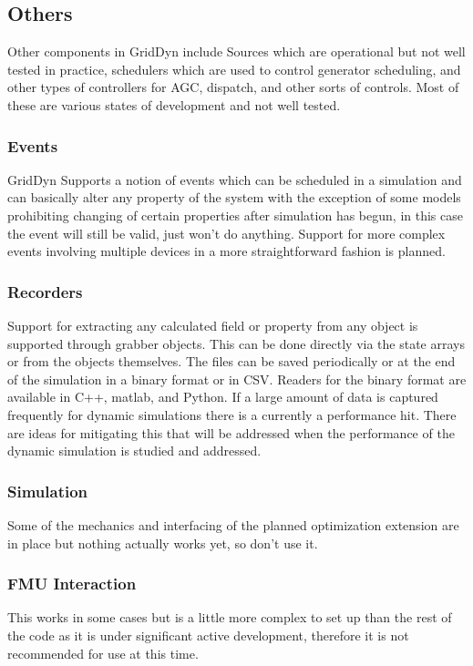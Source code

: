 \documentclass[12pt]{article} %
\begin{document}
\subsection{Others}
Other components in GridDyn include Sources which are operational but not well tested in practice,  schedulers which are used to control generator scheduling, and other types of controllers for AGC,  dispatch, and other sorts of controls.  Most of these are various states of development and not well tested.

\subsubsection{Events}
GridDyn Supports a notion of events which can be scheduled in a simulation and can basically alter any property of the system with the exception of some models prohibiting changing of certain properties after simulation has begun, in this case the event will still be valid, just won't do anything.  Support for more complex events involving multiple devices in a more straightforward fashion is planned.

\subsubsection{Recorders}
Support for extracting any calculated field or property from any object is supported through grabber objects.  This can be done directly via the state arrays or from the objects themselves.  The files can be saved periodically or at the end of the simulation in a binary format or in CSV.  Readers for the binary format are available in C++, matlab, and Python.  If a large amount of data is captured frequently for dynamic simulations there is a currently a performance hit.  There are ideas for mitigating this that will be addressed when the performance of the dynamic simulation is studied and addressed.

\subsubsection{Simulation}
Some of the mechanics and interfacing of the planned optimization extension are in place but nothing actually works yet, so don't use it.

\subsubsection{FMU Interaction}
This works in some cases but is a little more complex to set up than the rest of the code as it is under significant active development, therefore it is not recommended for use at this time.
\end{document}
